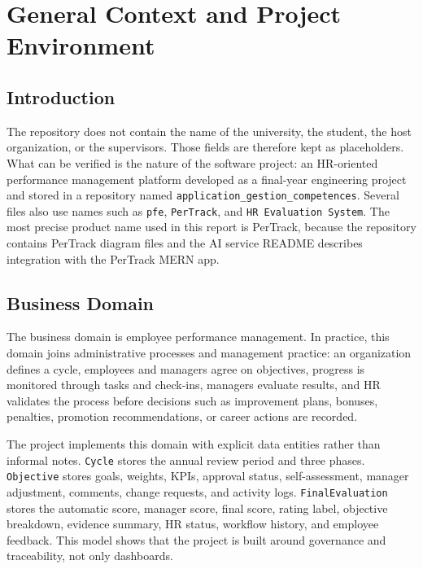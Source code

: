 \chapter{General Context and Project Environment}
\section{Introduction}
The repository does not contain the name of the university, the student, the host organization, or the supervisors. Those fields are therefore kept as placeholders. What can be verified is the nature of the software project: an HR-oriented performance management platform developed as a final-year engineering project and stored in a repository named \texttt{application\_gestion\_competences}. Several files also use names such as \texttt{pfe}, \texttt{PerTrack}, and \texttt{HR Evaluation System}. The most precise product name used in this report is PerTrack, because the repository contains PerTrack diagram files and the AI service README describes integration with the PerTrack MERN app.

\section{Business Domain}
The business domain is employee performance management. In practice, this domain joins administrative processes and management practice: an organization defines a cycle, employees and managers agree on objectives, progress is monitored through tasks and check-ins, managers evaluate results, and HR validates the process before decisions such as improvement plans, bonuses, penalties, promotion recommendations, or career actions are recorded.

The project implements this domain with explicit data entities rather than informal notes. \texttt{Cycle} stores the annual review period and three phases. \texttt{Objective} stores goals, weights, KPIs, approval status, self-assessment, manager adjustment, comments, change requests, and activity logs. \texttt{FinalEvaluation} stores the automatic score, manager score, final score, rating label, objective breakdown, evidence summary, HR status, workflow history, and employee feedback. This model shows that the project is built around governance and traceability, not only dashboards.

